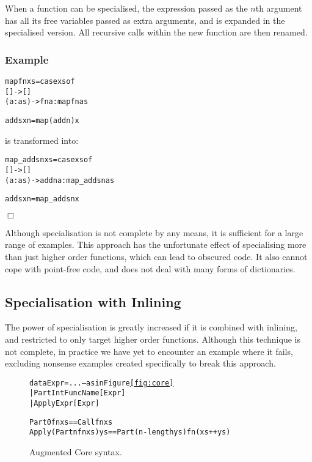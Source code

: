 \documentclass[preprint]{sigplanconf}
\newcounter{exmp}
\newcommand{\yesexample}{\subsubsection*{Example \arabic{exmp}}\addtocounter{exmp}{1}}
\newcommand{\noexample}{\hfill$\Box$}
\newenvironment{code}{\begin{alltt}\small}{\end{alltt}}
\newenvironment{example}{\yesexample}{\noexample}
\begin{document}
When a function can be specialised, the expression passed as the $n$th argument has all its free variables passed as extra arguments, and is expanded in the specialised version. All recursive calls within the new function are then renamed.

\begin{example}
\begin{code}
map fn xs = case  xs of
                  []      -> []
                  (a:as)  -> fn a : map fn as

adds x n = map (add n) x
\end{code}

\noindent is transformed into:

\begin{code}
map_adds n xs = case  xs of
                      []      -> []
                      (a:as)  -> add n a : map_adds n as

adds x n = map_adds n x
\end{code}
\end{example}

Although specialisation is not complete by any means, it is sufficient for a large range of examples. This approach has the unfortunate effect of specialising more than just higher order functions, which can lead to obscured code. It also cannot cope with point-free code, and does not deal with many forms of dictionaries.

\subsection{Specialisation with Inlining}

The power of specialisation is greatly increased if it is combined with inlining, and restricted to only target higher order functions. Although this technique is not complete, in practice we have yet to encounter an example where it fails, excluding nonsense examples created specifically to break this approach.

\begin{figure}
\begin{code}
data Expr  =  ... -- as in Figure {\ref{fig:core}}
           |  Part   Int FuncName [Expr]
           |  Apply  Expr [Expr]

Part 0 fn xs == Call fn xs
Apply (Part n fn xs) ys == Part (n - length ys) fn (xs ++ ys)
\end{code}
\caption{Augmented Core syntax.}
\label{fig:core_ho}
\end{figure}
\end{document}
